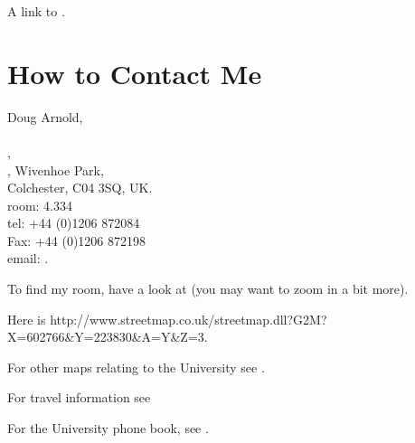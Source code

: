 \documentclass[a4paper]{article}
\begin{document}
A link to .


\section{How to Contact Me}

Doug Arnold,\\
\\
,\\
,
Wivenhoe Park,\\
Colchester, C04 3SQ, UK.\\

room: 4.334\\
tel: +44 (0)1206 872084\\
Fax: +44 (0)1206 872198\\
email: .

To find my room, have a look at 
(you may want to zoom in a bit more).


Here is 
              {http://www.streetmap.co.uk/streetmap.dll?G2M?X=602766\&Y=223830\&A=Y\&Z=3}.

For other maps relating to the University see .

For travel information see 

For the University phone book, see .

%
\end{document}
